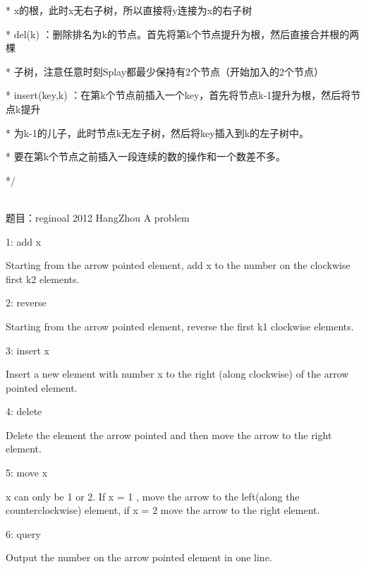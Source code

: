  *                        x的根，此时x无右子树，所以直接将y连接为x的右子树 \par
 * del(k)               ：删除排名为k的节点。首先将第k个节点提升为根，然后直接合并根的两棵 \par
 *                         子树，注意任意时刻Splay都最少保持有2个节点（开始加入的2个节点） \par
 * insert(key,k)      ：在第k个节点前插入一个key，首先将节点k-1提升为根，然后将节点k提升 \par
 *                      为k-1的儿子，此时节点k无左子树，然后将key插入到k的左子树中。 \par
 *                         要在第k个节点之前插入一段连续的数的操作和一个数差不多。 \par
*/ \par
~\\

题目：reginoal 2012 HangZhou A problem \par
1: add x \par
Starting from the arrow pointed element, add x to the number on the clockwise first k2 elements.\par
 \par
2: reverse \par
Starting from the arrow pointed element, reverse the first k1 clockwise elements. \par
 \par
3: insert x  \par
Insert a new element with number x to the right (along clockwise) of the arrow pointed element. \par
 \par
4: delete  \par
Delete the element the arrow pointed and then move the arrow to the right element. \par
 \par
5: move x  \par
x can only be 1 or 2. If x = 1 , move the arrow to the left(along the counterclockwise) element, if x = 2 move the arrow to the right element. \par
 \par
6: query \par
Output the number on the arrow pointed element in one line. \par

